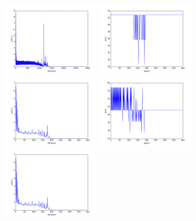 \begin{figure}[htb]
\centering
\includegraphics[width=0.45\textwidth]{images/redes/ejecucion1/general_svm_mfsd/cost.png}
\includegraphics[width=0.45\textwidth]{images/redes/ejecucion1/general_svm_mfsd/error.png}
\includegraphics[width=0.45\textwidth]{images/redes/ejecucion1/general_svm_mfsd/minidataset/minidatasetcost.png}
\includegraphics[width=0.45\textwidth]{images/redes/ejecucion1/general_svm_mfsd/minidataset/minidataseterror.png}
\includegraphics[width=0.45\textwidth]{images/redes/ejecucion1/general_svm_mfsd/minidataset_tested_itself/cost.png}

\end{figure}
